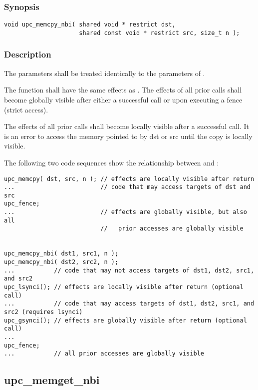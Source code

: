 \subsubsection{Synopsis}

\begin{verbatim}
void upc_memcpy_nbi( shared void * restrict dst,
                     shared const void * restrict src, size_t n );
\end{verbatim}

\subsubsection{Description}

\npf The parameters shall be treated identically to the parameters of
\memcpy{}.

\np The \function{} function shall have the same effects as \memcpy{}.
The effects of all prior \function{} calls shall become globally visible after
either a successful \gsynci{} call or upon executing a fence (strict access).

\np The effects of all prior \function{} calls shall become locally
visible after a successful \lsynci{} call.  It is an error to access the memory
pointed to by dst or src until the copy is locally visible.

\np The following two code sequences show the relationship between
\memcpy{} and \function{}:

\begin{verbatim}
upc_memcpy( dst, src, n ); // effects are locally visible after return
...                        // code that may access targets of dst and src
upc_fence;                 
...                        // effects are globally visible, but also all
                           //   prior accesses are globally visible


upc_memcpy_nbi( dst1, src1, n );
upc_memcpy_nbi( dst2, src2, n );
...           // code that may not access targets of dst1, dst2, src1, and src2
upc_lsynci(); // effects are locally visible after return (optional call)
...           // code that may access targets of dst1, dst2, src1, and src2 (requires lsynci)
upc_gsynci(); // effects are globally visible after return (optional call)
...
upc_fence;
...           // all prior accesses are globally visible
\end{verbatim}

\newpage
\subsection{upc\_memget\_nbi}
\def\function{{\tt upc\_memget\_nbi}}

